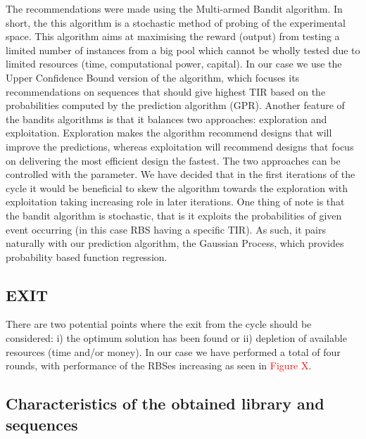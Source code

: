 \documentclass{article}
\begin{document}
The recommendations were made using the Multi-armed Bandit algorithm.
In short, the this algorithm is a stochastic method of probing of the experimental space. 
This algorithm aims at maximising the reward (output) from testing a limited number of instances from a big pool which cannot be wholly tested due to limited resources (time, computational power, capital). 
In our case we use the Upper Confidence Bound version of the algorithm, which focuses its recommendations on sequences that should give highest TIR based on the probabilities computed by the prediction algorithm (GPR). 
Another feature of the bandits algorithms is that it balances two approaches: exploration and exploitation. 
Exploration makes the algorithm recommend designs that will improve the predictions, whereas exploitation will recommend designs that focus on delivering the most efficient design the fastest. 
The two approaches can be controlled with the \textbeta\enspace parameter. 
We have decided that in the first iterations of the cycle it would be beneficial to skew the algorithm towards the exploration with exploitation taking increasing role in later iterations. 
One thing of note is that the bandit algorithm is stochastic, that is it exploits the probabilities of given event occurring (in this case RBS having a specific TIR). 
As such, it pairs naturally with our prediction algorithm, the Gaussian Process, which provides probability based function regression.
\\

\subsection{EXIT}
There are two potential points where the exit from the cycle should be considered: i) the optimum solution has been found or ii) depletion of available resources (time and/or money). In our case we have performed a total of four rounds, with performance of the RBSes increasing as seen in \textcolor{red}{Figure X}.\\

\subsection{Characteristics of the obtained library and sequences}
\end{document}
